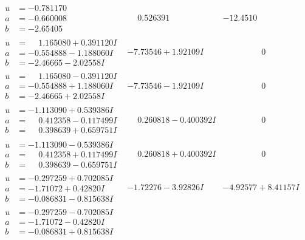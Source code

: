 \documentclass[1p]{elsarticle_modified}
\theoremstyle{definition}
\begin{document}
$$\begin{array}{c|c|c}
 \hline 
\begin{aligned}
u &= -0.781170\phantom{ +0.000000I} \\
a &= -0.660008\phantom{ +0.000000I} \\
b &= -2.65405\phantom{ +0.000000I}\end{aligned}
 & \phantom{-}0.526391\phantom{ +0.000000I} & -12.4510\phantom{ +0.000000I} \\ \hline\begin{aligned}
u &= \phantom{-}1.165080 + 0.391120 I \\
a &= -0.554888 - 1.188060 I \\
b &= -2.46665 - 2.02558 I\end{aligned}
 & -7.73546 + 1.92109 I & \phantom{-0.000000 } 0 \\ \hline\begin{aligned}
u &= \phantom{-}1.165080 - 0.391120 I \\
a &= -0.554888 + 1.188060 I \\
b &= -2.46665 + 2.02558 I\end{aligned}
 & -7.73546 - 1.92109 I & \phantom{-0.000000 } 0 \\ \hline\begin{aligned}
u &= -1.113090 + 0.539386 I \\
a &= \phantom{-}0.412358 - 0.117499 I \\
b &= \phantom{-}0.398639 + 0.659751 I\end{aligned}
 & \phantom{-}0.260818 - 0.400392 I & \phantom{-0.000000 } 0 \\ \hline\begin{aligned}
u &= -1.113090 - 0.539386 I \\
a &= \phantom{-}0.412358 + 0.117499 I \\
b &= \phantom{-}0.398639 - 0.659751 I\end{aligned}
 & \phantom{-}0.260818 + 0.400392 I & \phantom{-0.000000 } 0 \\ \hline\begin{aligned}
u &= -0.297259 + 0.702085 I \\
a &= -1.71072 + 0.42820 I \\
b &= -0.086831 - 0.815638 I\end{aligned}
 & -1.72276 - 3.92826 I & -4.92577 + 8.41157 I \\ \hline\begin{aligned}
u &= -0.297259 - 0.702085 I \\
a &= -1.71072 - 0.42820 I \\
b &= -0.086831 + 0.815638 I\end{aligned}

\end{array}$$
\end{document}

